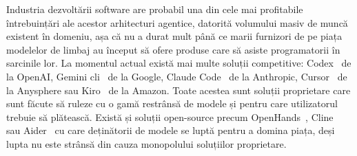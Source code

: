 \documentclass[12pt, a4paper, oneside, romanian]{teza-upb}
\begin{document}
  Industria dezvoltării software are probabil una din cele mai profitabile întrebuințări ale acestor arhitecturi agentice, datorită volumului masiv de muncă existent
  în domeniu, așa că nu a durat mult până ce marii furnizori de pe piața modelelor de limbaj au început să ofere produse care să asiste programatorii în sarcinile lor.
  La momentul actual există mai multe soluții competitive: Codex~\cite{gh_codex} de la OpenAI, Gemini \ac{cli}~\cite{gh_gemini_cli} de la Google, Claude Code~\cite{api_claude_code} de la Anthropic, Cursor~\cite{web_cursor} de la Anysphere sau Kiro~\cite{web_kiro} de la Amazon. Toate acestea sunt soluții
  proprietare care sunt făcute să ruleze cu o gamă restrânsă de modele și pentru care utilizatorul trebuie să plătească. Există și soluții open-source precum OpenHands~\cite{gh_openhands}, Cline~\cite{gh_cline}
  sau Aider~\cite{gh_aider} cu care deținătorii de modele se luptă pentru a domina piața, deși lupta nu este strânsă din cauza monopolului soluțiilor proprietare.
 
\end{document}
